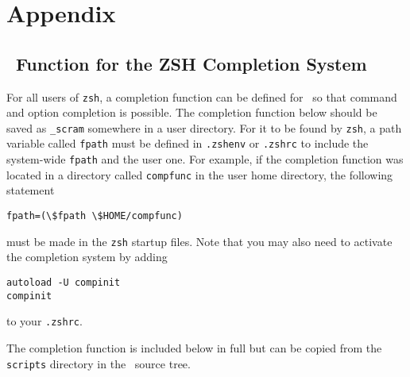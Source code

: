 \chapter{Appendix}\label{ch:appendix}

\section{\scram\ Function for the ZSH Completion System}

For all users of \texttt{zsh}, a completion function can be defined
for \scram\ so that command and option completion is possible. The
completion function below should be saved as \texttt{\_scram}
somewhere in a user directory. For it to be found by \texttt{zsh}, a
path variable called \texttt{fpath} must be defined in
\texttt{.zshenv} or \texttt{.zshrc} to include the
system-wide \texttt{fpath} and the user one. For example, if the
completion function was located in a directory called
\texttt{compfunc} in the user home directory, the following statement 
\begin{verbatim}
fpath=(\$fpath \$HOME/compfunc)
\end{verbatim}
must be made in the \texttt{zsh} startup files. Note that you may also
need to activate the completion system by adding
\begin{verbatim}
autoload -U compinit
compinit
\end{verbatim}
to your \texttt{.zshrc}.

\ni The completion function is included below in full but can be copied from the
\texttt{scripts} directory in the \scram\ source tree.

